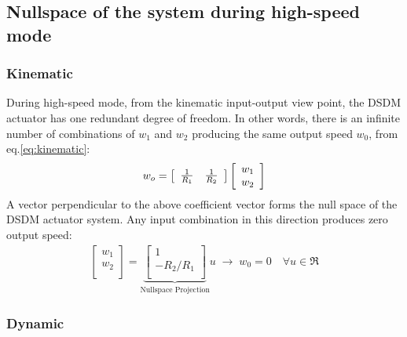 
\subsection{Nullspace of the system during high-speed mode}

\subsubsection{Kinematic}

During high-speed mode, from the kinematic input-output view point, the DSDM actuator has one redundant degree of freedom. In other words, there is an infinite number of combinations of $w_1$ and $w_2$ producing the same output speed $w_0$, from eq.\eqref{eq:kinematic}:  
%
\begin{align}
w_o
 = 
\left[
\begin{array}{c c}
\frac{1}{R_1} & \frac{1}{R_2}
\end{array}
\right]
\left[
\begin{array}{c}
w_1 \\
w_2 \\
\end{array}
\right]
\end{align}
%
A vector perpendicular to the above coefficient vector forms the null space of the DSDM actuator system. Any input combination in this direction produces zero output speed:
%
\begin{align}
\left[
\begin{array}{c}
w_1 \\
w_2 \\
\end{array}
\right]=
\underbrace{\left[
\begin{array}{c}
1 \\
-R_2/R_1 \\
\end{array}
\right]}_{\text{Nullspace Projection}}
u  \; \rightarrow \;
w_0 = 0 \quad \forall u \in \Re
\label{eq:kinematicnullspace}
\end{align}
%

\subsubsection{Dynamic}

